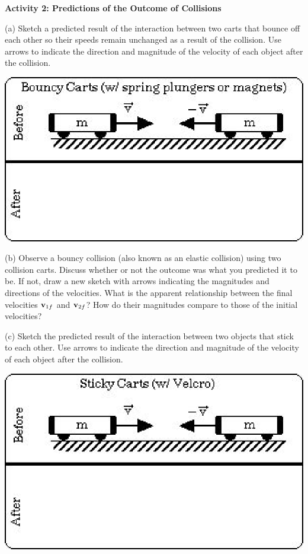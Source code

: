 \textbf{Activity 2: Predictions of the Outcome of Collisions }

(a) Sketch a predicted result of the interaction between two carts that bounce
off each other so their speeds remain unchanged as a result of the collision.
Use arrows to indicate the direction and magnitude of the velocity of each object after the collision.

\vspace{0.3cm}
{\par\centering \includegraphics{mom_cons/mom_cons_fig3.eps} \par}
\vspace{0.3cm}

(b) Observe a bouncy collision (also known as an elastic collision) using two collision carts. Discuss whether or not the outcome was what you predicted it to be. If not, draw a new sketch with arrows indicating the magnitudes and directions of the velocities. What is the apparent relationship between the final velocities \( {{\bf v}_{1f}} \) and \( {{\bf v}_{2f}} \)? How do their magnitudes compare to those of the initial velocities?
\vspace{20mm}

(c) Sketch the predicted result of the interaction between two objects that
stick to each other. Use arrows to indicate the direction and magnitude of the velocity
of each object after the collision.

\vspace{0.3cm}
{\par\centering \includegraphics[scale=0.9]{mom_cons/mom_cons_fig4.eps} \par}
\vspace{0.3cm}


